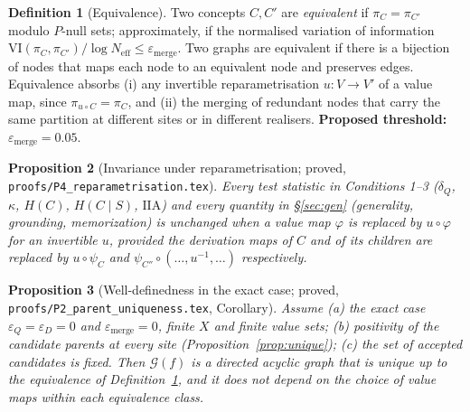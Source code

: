 \documentclass[11pt]{article}
\theoremstyle{definition}
\newtheorem{definition}{Definition}[section]
\theoremstyle{plain}
\newtheorem{proposition}[definition]{Proposition}
\theoremstyle{remark}
\newcommand{\Hent}{H}
\newcommand{\G}{\mathcal{G}}
\newcommand{\Part}{\pi}
\newcommand{\VI}{\mathrm{VI}}
\newcommand{\IIA}{\mathrm{IIA}}
\begin{document}
\begin{definition}[Equivalence]\label{def:equiv}
Two concepts $C,C'$ are \emph{equivalent} if $\Part_C=\Part_{C'}$ modulo
$P$-null sets; approximately, if the normalised variation of information
$\VI(\Part_C,\Part_{C'})/\log N_{\mathrm{eff}}\le\varepsilon_{\mathrm{merge}}$.
Two graphs are equivalent if there is a bijection of nodes that maps each node
to an equivalent node and preserves edges. Equivalence absorbs (i) any
invertible reparametrisation $u\colon V\to V'$ of a value map, since
$\Part_{u\circ C}=\Part_C$, and (ii) the merging of redundant nodes that carry
the same partition at different sites or in different realisers.
\textbf{Proposed threshold:} $\varepsilon_{\mathrm{merge}}=0.05$.
\end{definition}

\begin{proposition}[Invariance under reparametrisation; proved,
\texttt{proofs/P4\_reparametrisation.tex}]\label{prop:reparam}
Every test statistic in Conditions 1--3 ($\delta_Q$, $\kappa$, $\Hent(C)$,
$\Hent(C\mid S)$, $\IIA$) and every quantity in \S\ref{sec:gen}
(generality, grounding, memorization) is unchanged when a value map $\varphi$
is replaced by $u\circ\varphi$ for an invertible $u$, provided the derivation
maps of $C$ and of its children are replaced by $u\circ\psi_C$ and
$\psi_{C''}\circ(\dots,u^{-1},\dots)$ respectively.
\end{proposition}

\begin{proposition}[Well-definedness in the exact case; proved,
\texttt{proofs/P2\_parent\_uniqueness.tex}, Corollary]\label{prop:welldef}
Assume (a) the exact case $\varepsilon_Q=\varepsilon_D=0$ and
$\varepsilon_{\mathrm{merge}}=0$, finite $X$ and finite value sets;
(b) positivity of the candidate parents at every site
(Proposition~\ref{prop:unique}); (c) the set of accepted candidates is fixed. Then
$\G(f)$ is a directed acyclic graph that is unique up to the equivalence of
Definition~\ref{def:equiv}, and it does not depend on the choice of value maps within
each equivalence class.
\end{proposition}
\end{document}
